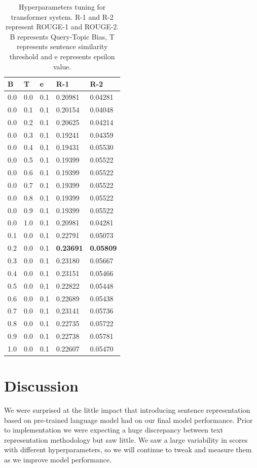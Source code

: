 \documentclass[11pt,a4paper]{article}
\begin{document}
\begin{table}[h]
\centering
\begin{tabular}{|l|l|l|l|l|} \hline \textbf{B} & \textbf{T} & \textbf{e} & \textbf{R-1} & \textbf{R-2}\\ \hline
 0.0 & 0.0 & 0.1 & 0.20981 & 0.04281 \\ \hline
 0.0 & 0.1 & 0.1 & 0.20154 & 0.04048 \\ \hline
 0.0 & 0.2 & 0.1 & 0.20625 & 0.04214 \\ \hline
 0.0 & 0.3 & 0.1 & 0.19241 & 0.04359 \\ \hline
 0.0 & 0.4 & 0.1 & 0.19431 & 0.05530 \\ \hline
 0.0 & 0.5 & 0.1 & 0.19399 & 0.05522 \\ \hline
 0.0 & 0.6 & 0.1 & 0.19399 & 0.05522 \\ \hline
 0.0 & 0.7 & 0.1 & 0.19399 & 0.05522\\ \hline
 0.0 & 0.8 & 0.1 & 0.19399 & 0.05522 \\ \hline
 0.0 & 0.9 & 0.1 & 0.19399 & 0.05522 \\ \hline
 0.0 & 1.0 & 0.1 & 0.20981 & 0.04281 \\ \hline
 0.1 & 0.0 & 0.1 & 0.22791 & 0.05073 \\ \hline
 0.2 & 0.0 & 0.1 & \textbf{0.23691} &\textbf{0.05809} \\ \hline
 0.3 & 0.0 & 0.1 & 0.23180 & 0.05667 \\ \hline
 0.4 & 0.0 & 0.1 & 0.23151 & 0.05466 \\ \hline
 0.5 & 0.0 & 0.1 & 0.22822 & 0.05448 \\ \hline
 0.6 & 0.0 & 0.1 & 0.22689 & 0.05438 \\ \hline
 0.7 & 0.0 & 0.1 & 0.23141 & 0.05736 \\ \hline
 0.8 & 0.0 & 0.1 & 0.22735 & 0.05722 \\ \hline
 0.9 & 0.0 & 0.1 & 0.22738 & 0.05781 \\ \hline
 1.0 & 0.0 & 0.1 & 0.22607 & 0.05470 \\ \hline
\end{tabular}
\label{table:2}
\caption{Hyperparameters tuning for transformer system. R-1 and R-2 represent ROUGE-1 and ROUGE-2. B represents Query-Topic Bias, T represents sentence similarity threshold and e represents epsilon value.}
\end{table}
\section{Discussion}
We were surprised at the little impact that introducing sentence representation based on pre-trained language model had on our final model performance. Prior to implementation we were expecting a huge discrepancy between text representation methodology but saw little. We saw a large variability in scores with different hyperparameters, so we will continue to tweak and measure them as we improve model performance.
\end{document}
